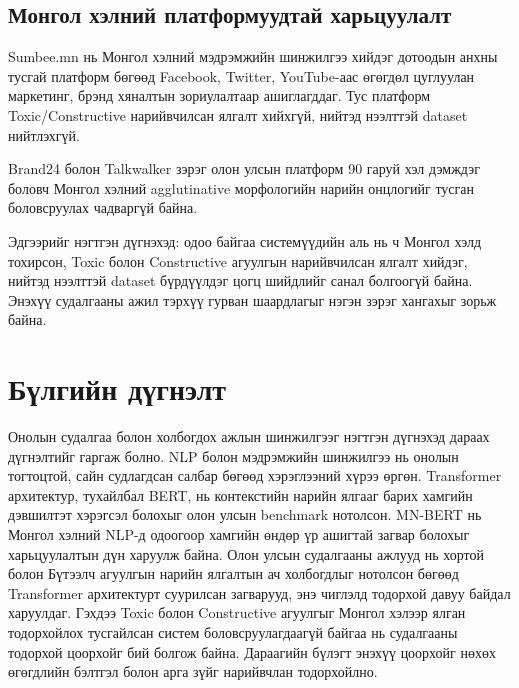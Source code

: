 \subsection{Монгол хэлний платформуудтай харьцуулалт}

Sumbee.mn нь Монгол хэлний мэдрэмжийн шинжилгээ хийдэг дотоодын анхны тусгай
платформ бөгөөд Facebook, Twitter, YouTube-аас өгөгдөл цуглуулан маркетинг,
брэнд хяналтын зориулалтаар ашиглагддаг. Тус платформ Toxic/Constructive
нарийвчилсан ялгалт хийхгүй, нийтэд нээлттэй dataset нийтлэхгүй.

Brand24 болон Talkwalker зэрэг олон улсын платформ 90 гаруй хэл дэмждэг боловч
Монгол хэлний agglutinative морфологийн нарийн онцлогийг тусган боловсруулах
чадваргүй байна.

Эдгээрийг нэгтгэн дүгнэхэд: одоо байгаа системүүдийн аль нь ч Монгол хэлд
тохирсон, Toxic болон Constructive агуулгын нарийвчилсан ялгалт хийдэг, нийтэд
нээлттэй dataset бүрдүүлдэг цогц шийдлийг санал болгоогүй байна. Энэхүү
судалгааны ажил тэрхүү гурван шаардлагыг нэгэн зэрэг хангахыг зорьж байна.


\section{Бүлгийн дүгнэлт}

Онолын судалгаа болон холбогдох ажлын шинжилгээг нэгтгэн дүгнэхэд дараах
дүгнэлтийг гаргаж болно. NLP болон мэдрэмжийн шинжилгээ нь онолын тогтоцтой,
сайн судлагдсан салбар бөгөөд хэрэглээний хүрээ өргөн. Transformer архитектур,
тухайлбал BERT, нь контекстийн нарийн ялгааг барих хамгийн дэвшилтэт хэрэгсэл
болохыг олон улсын benchmark нотолсон. MN-BERT нь Монгол хэлний NLP-д одоогоор
хамгийн өндөр үр ашигтай загвар болохыг харьцуулалтын дүн харуулж байна.
Олон улсын судалгааны ажлууд нь хортой болон Бүтээлч агуулгын нарийн ялгалтын
ач холбогдлыг нотолсон бөгөөд Transformer архитектурт суурилсан загварууд, энэ
чиглэлд тодорхой давуу байдал харуулдаг. Гэхдээ Toxic болон Constructive
агуулгыг Монгол хэлээр ялган тодорхойлох тусгайлсан систем боловсруулагдаагүй
байгаа нь судалгааны тодорхой цоорхойг бий болгож байна. Дараагийн бүлэгт
энэхүү цоорхойг нөхөх өгөгдлийн бэлтгэл болон арга зүйг нарийвчлан
тодорхойлно.
